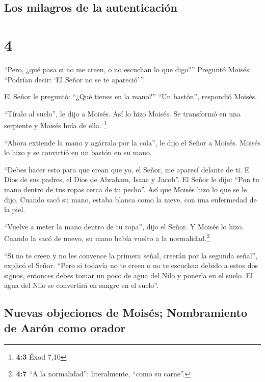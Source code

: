 \hypertarget{los-milagros-de-la-autenticaciuxf3n}{%
\subsection{Los milagros de la
autenticación}\label{los-milagros-de-la-autenticaciuxf3n}}

\hypertarget{section-3}{%
\section{4}\label{section-3}}

 ``Pero, ¿qué pasa si no me creen, o no escuchan lo que
digo?'' Preguntó Moisés. ``Podrían decir: `El Señor no se te
apareció'\,''.

 El Señor le preguntó: ``¿Qué tienes en la mano?'' ``Un
bastón'', respondió Moisés.

 ``Tíralo al suelo'', le dijo a Moisés. Así lo hizo
Moisés. Se transformó en una serpiente y Moisés huía de ella.
\footnote{\textbf{4:3} Éxod 7,10}

 ``Ahora extiende la mano y agárrala por la cola'', le
dijo el Señor a Moisés. Moisés lo hizo y se convirtió en un bastón en su
mano.

 ``Debes hacer esto para que crean que yo, el Señor, me
aparecí delante de ti. E Dios de sus padres, el Dios de Abraham, Isaac y
Jacob''.  El Señor le dijo: ``Pon tu mano dentro de tus
ropas cerca de tu pecho''. Así que Moisés hizo lo que se le dijo. Cuando
sacó su mano, estaba blanca como la nieve, con una enfermedad de la
piel.

 ``Vuelve a meter la mano dentro de tu ropa'', dijo el
Señor. Y Moisés lo hizo. Cuando la sacó de nuevo, su mano había vuelto a
la normalidad.\footnote{\textbf{4:7} ``A la normalidad'': literalmente,
  ``como su carne''.}

 ``Si no te creen y no les convence la primera señal,
creerán por la segunda señal'', explicó el Señor.  ``Pero
si todavía no te creen o no te escuchan debido a estos dos signos,
entonces debes tomar un poco de agua del Nilo y ponerla en el suelo. El
agua del Nilo se convertirá en sangre en el suelo''.

\hypertarget{nuevas-objeciones-de-moisuxe9s-nombramiento-de-aaruxf3n-como-orador}{%
\subsection{Nuevas objeciones de Moisés; Nombramiento de Aarón como
orador}\label{nuevas-objeciones-de-moisuxe9s-nombramiento-de-aaruxf3n-como-orador}}

